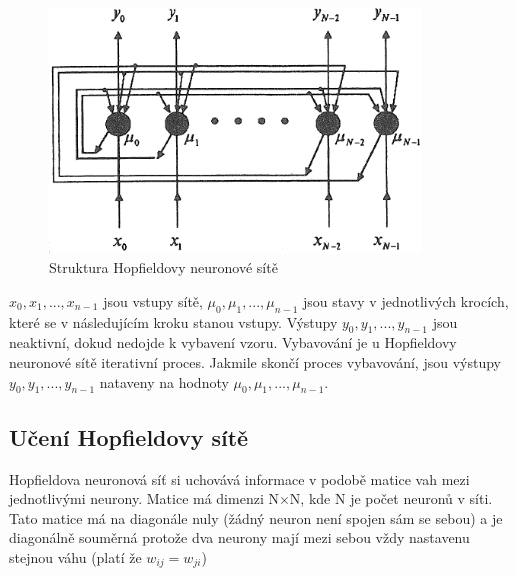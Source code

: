 \documentclass[11pt,twoside,a4paper]{book}
\begin{document}
\begin{figure}[!h]
\begin{center}
\includegraphics[height=6.5cm]{figures/hopfield.png}
\caption{Struktura Hopfieldovy neuronové sítě\cite{skripta}}
\label{fig:hopfieldstr}
\end{center}
\end{figure}
\begin{math}x_{0},x_{1},...,x_{n-1}\end{math} jsou vstupy sítě, \begin{math}\mu _{0},\mu _{1},...,\mu _{n-1}\end{math} jsou stavy v jednotlivých krocích, které se v následujícím kroku stanou vstupy. Výstupy \begin{math}y_{0},y_{1},...,y_{n-1}\end{math} jsou neaktivní, dokud nedojde k vybavení vzoru. Vybavování je u Hopfieldovy neuronové sítě iterativní proces. Jakmile skončí proces vybavování, jsou výstupy \begin{math}y_{0},y_{1},...,y_{n-1}\end{math} nataveny na hodnoty \begin{math}\mu _{0},\mu _{1},...,\mu _{n-1}\end{math}.

\subsection{Učení Hopfieldovy sítě}
Hopfieldova neuronová síť si uchovává informace v podobě matice vah mezi jednotlivými neurony. Matice má dimenzi N\begin{math}\times\end{math}N, kde N je počet neuronů v síti. Tato matice má na diagonále nuly (žádný neuron není spojen sám se sebou) a je diagonálně souměrná protože dva neurony mají mezi sebou vždy nastavenu stejnou váhu (platí že \begin{math}w_{ij}=w_{ji}\end{math})
\end{document}
